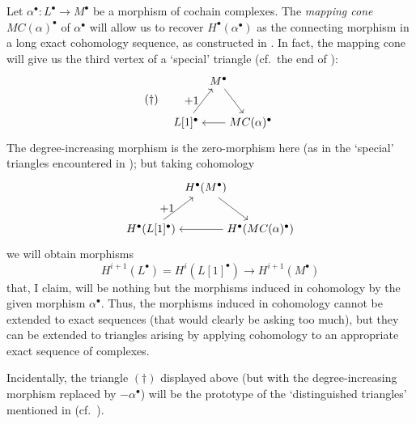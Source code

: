 Let $\alpha^\bullet : L^\bullet \to M^\bullet$ be a morphism of
cochain complexes. The \emph{mapping cone} $MC(\alpha)^\bullet$ of
$\alpha^\bullet$ will allow us to recover $H^\bullet(\alpha^\bullet)$
as the connecting morphism in a long exact cohomology sequence, as
constructed in
. In fact,
the mapping cone will give us the third vertex of a `special' triangle
(cf.\ the end of ):
\[
  (\dagger) \quad
  \begin{tikzpicture}[baseline=(current bounding box.center)]
    \node (M) at (1,1.3)
    {$M^\bullet$}; \node (L) at (0,0)
    {$L[1]^\bullet$}; \node (C) at (2,0)
    {$MC(\alpha)^\bullet$}; \draw[->] (M) -- (C); \draw[->] (C) --
    (L); \draw[->] (L) -- (M) node[midway, left] {$+1$};
  \end{tikzpicture}
\]
The degree-increasing morphism is the zero-morphism here (as in the
`special' triangles encountered in );
but taking cohomology
\[
  \begin{tikzpicture}[baseline=(current bounding box.center)]
    \node (M) at (1.7,1.3)
    {$H^\bullet(M^\bullet)$}; \node (L) at (0,0)
    {$H^\bullet(L[1]^\bullet)$}; \node (C) at (3.4,0)
    {$H^\bullet(MC(\alpha)^\bullet)$}; \draw[->] (M) -- (C); \draw[->]
    (C) -- (L); \draw[->] (L) -- (M) node[midway, left] {$+1$};
  \end{tikzpicture}
\]
we will obtain morphisms
\[
  H^{i+1}(L^\bullet) = H^i(L[1]^\bullet) \longrightarrow
  H^{i+1}(M^\bullet)
\]
that, I claim, will be nothing but the morphisms induced in cohomology
by the given morphism $\alpha^\bullet$. Thus, the morphisms induced in
cohomology cannot be extended to exact sequences (that would clearly
be asking too much), but they can be extended to triangles arising by
applying cohomology to an appropriate exact sequence of complexes.

Incidentally, the triangle $(\dagger)$ displayed above (but with the
degree-increasing morphism replaced by $-\alpha^\bullet$) will be the
prototype of the `distinguished triangles' mentioned in
 (cf.\
).

